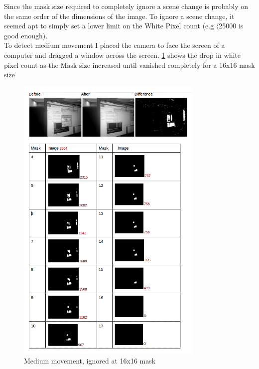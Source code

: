 Since the mask size required to completely ignore a scene change is probably on the same order of the dimensions of the image.  To ignore a scene change, it seemed apt to simply set a lower limit on the White Pixel count (e.g \(\langle\)25000 is good enough).
\\To detect medium movement I placed the camera to face the screen of a computer and dragged a window across the screen. \cref{img:medium} shows the drop in white pixel count as the Mask size increased until vanished completely for a 16x16 mask size
\begin{figure}[H]
	\vspace{-12pt}
	\begin{center}
		\includegraphics[width=0.8\textwidth]{../images/ImageOps/LARGE}
	\end{center}
	\vspace{-30pt}
	\caption{Medium movement, ignored at 16x16 mask}
	\label{img:medium}
	\vspace{-40pt}
\end{figure}

